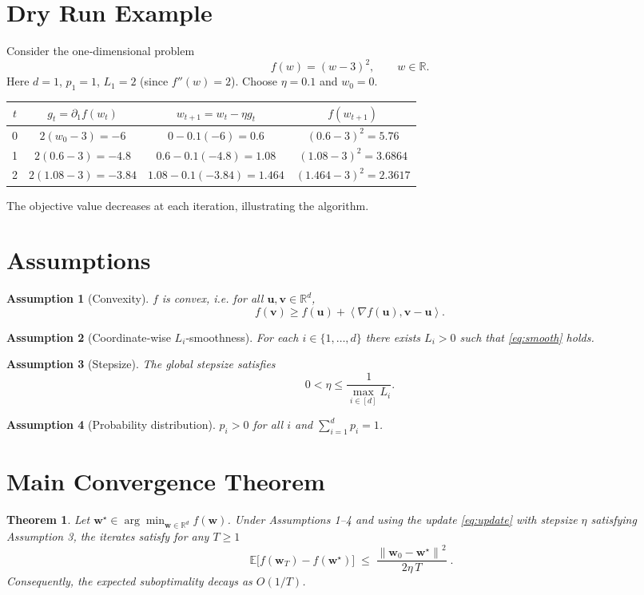 \documentclass{article}
\newtheorem{theorem}{Theorem}
\newtheorem{assumption}{Assumption}
\newcommand{\E}{\mathbb{E}}
\newcommand{\R}{\mathbb{R}}
\newcommand{\norm}[1]{\left\lVert #1 \right\rVert}
\newcommand{\ip}[2]{\left\langle #1,#2 \right\rangle}
\begin{document}
\section*{Dry Run Example}
Consider the one‑dimensional problem
\[
f(w)=(w-3)^2,\qquad w\in\R .
\]
Here $d=1$, $p_1=1$, $L_1=2$ (since $f''(w)=2$).  
Choose $\eta=0.1$ and $w_0=0$.

\begin{center}
\begin{tabular}{c|c|c|c}
$t$ & $g_t=\partial_1 f(w_t)$ & $w_{t+1}=w_t-\eta g_t$ & $f(w_{t+1})$\\\hline
0 & $2(w_0-3)=-6$ & $0-0.1(-6)=0.6$ & $(0.6-3)^2=5.76$\\
1 & $2(0.6-3)=-4.8$ & $0.6-0.1(-4.8)=1.08$ & $(1.08-3)^2=3.6864$\\
2 & $2(1.08-3)=-3.84$ & $1.08-0.1(-3.84)=1.464$ & $(1.464-3)^2=2.3617$\\
\end{tabular}
\end{center}
The objective value decreases at each iteration, illustrating the algorithm.

\newpage
\section*{Assumptions}
\begin{assumption}[Convexity]
$f$ is convex, i.e. for all $\mathbf u,\mathbf v\in\R^{d}$,
\[
f(\mathbf v)\ge f(\mathbf u)+\ip{\nabla f(\mathbf u)}{\mathbf v-\mathbf u}.
\]
\end{assumption}
\begin{assumption}[Coordinate‑wise $L_i$‑smoothness]
For each $i\in\{1,\dots,d\}$ there exists $L_i>0$ such that \eqref{eq:smooth} holds.
\end{assumption}
\begin{assumption}[Stepsize]
The global stepsize satisfies
\[
0<\eta\le \frac{1}{\displaystyle\max_{i\in[d]}L_i}.
\]
\end{assumption}
\begin{assumption}[Probability distribution]
$p_i>0$ for all $i$ and $\sum_{i=1}^{d}p_i=1$.
\end{assumption}

\section*{Main Convergence Theorem}
\begin{theorem}
\label{thm:conv}
Let $\mathbf w^\star\in\arg\min_{\mathbf w\in\R^{d}}f(\mathbf w)$.  
Under Assumptions 1–4 and using the update \eqref{eq:update} with stepsize $\eta$ satisfying Assumption 3, the iterates satisfy for any $T\ge1$
\[
\boxed{\;
\E\!\bigl[f(\mathbf w_T)-f(\mathbf w^\star)\bigr]
\;\le\;
\frac{\norm{\mathbf w_0-\mathbf w^\star}^{2}}{2\eta\,T}\; } .
\]
Consequently, the expected suboptimality decays as $O(1/T)$.
\end{theorem}
\end{document}
